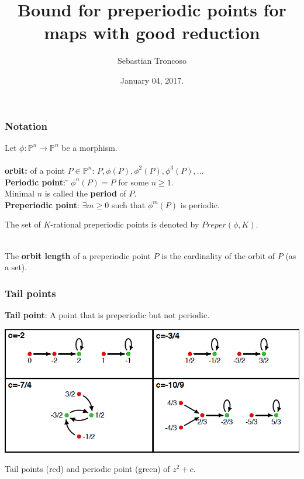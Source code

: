 \documentclass{beamer}
\title[Bounds for Preperiodic points]{Bound for preperiodic points for maps with good reduction}
\author[S. Troncoso]{Sebastian Troncoso}
\institute[MSU]{Michigsn State University}
\date[ January 04, 2017.]{ January 04, 2017. \\ \vspace{1cm} }
\newenvironment{nstabbing}
  {\setlength{\topsep}{0pt}%
   \setlength{\partopsep}{0pt}%
   \tabbing}
  {\endtabbing}
\def\jump{ \quad \\ \vspace{0.7cm} \pause}
\def\PP{{\mathbb P}}
\theoremstyle{thmstyle}
\theoremstyle{mystyle}
\theoremstyle{qstnstyle}
\begin{document}
\begin{frame}
\titlepage
\end{frame}

\begin{frame}
\frametitle{Notation}
Let $\phi:\mathbb{P}^n\to\mathbb{P}^n$ be a morphism. \\\quad\\
\pause
\textbf{orbit:} of a point $P\in\PP^n$: \quad \(P, \phi(P),
\phi^2(P),\phi^3(P),\ldots\)
\jump
\begin{nstabbing}
\textbf{Periodic point}: \= $\phi^n(P)=P$ for some $n\geq{1}$. \\
\> Minimal $n$ is called the \textbf{period} of $P$.
\end{nstabbing}
\jump
\textbf{Preperiodic point}: $\exists m\geq{0}$ such that $\phi^m(P)$
is periodic.
\pause
\vspace{2mm}

The set of $K$-rational preperiodic points is denoted by $Preper(\phi,K)$.


\jump
The \textbf{orbit length} of a preperiodic point $P$ is the cardinality of the orbit of $P$ (as a set).
\end{frame}

\begin{frame}
\frametitle{Tail points}

\textbf{Tail point}: A point that is preperiodic but not periodic.%
\pause 


\begin{center}
\includegraphics[width=1.0\linewidth]{placeholder4}
\end{center}

Tail points (red) and periodic point (green) of  $z^2+c$.
\end{frame}
\end{document}
